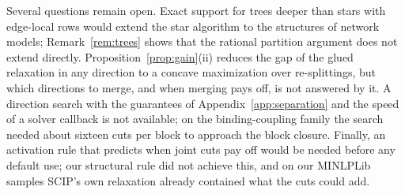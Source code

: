 Several questions remain open. Exact support for trees deeper than stars with
edge-local rows would extend the star algorithm to the structures of network
models; Remark~\ref{rem:trees} shows that the rational partition argument
does not extend directly. Proposition~\ref{prop:gain}(ii) reduces the gap of
the glued relaxation in any direction to a concave maximization over
re-splittings, but which directions to merge, and when merging pays off, is
not answered by it. A direction search with the guarantees of
Appendix~\ref{app:separation} and the speed of a solver callback is not
available; on the binding-coupling family the search needed about sixteen cuts
per block to approach the block closure. Finally, an activation rule that
predicts when joint cuts pay off would be needed before any default use; our
structural rule did not achieve this, and on our MINLPLib samples SCIP's own
relaxation already contained what the cuts could add.
